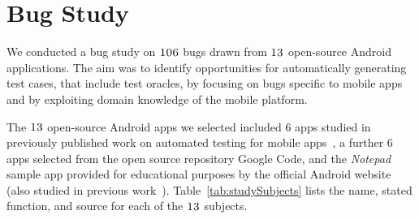 \section{Bug Study}
\label{study}


We conducted a bug study on $\textsc{106}$ bugs drawn from $\textsc{13}$ open-source Android applications. The aim was to identify opportunities for automatically generating test cases, that include test oracles, by focusing on bugs specific to mobile apps and by exploiting domain knowledge of the mobile platform.

The $\textsc{13}$ open-source Android apps we selected %
included $6$ apps studied in previously published work on automated testing for mobile apps~\cite{Hu:2011:AST,AmalfitanoASE2012,Nguyen:2012:ISSTA}, a further $6$ apps selected from the open source repository Google Code, and the \textit{Notepad} sample app provided for educational purposes by the official Android website (also studied in previous work~\cite{Nguyen:2012:ISSTA}). Table~\ref{tab:studySubjects} lists the name, stated function, and source for each of the $\textsc{13}$ subjects.

